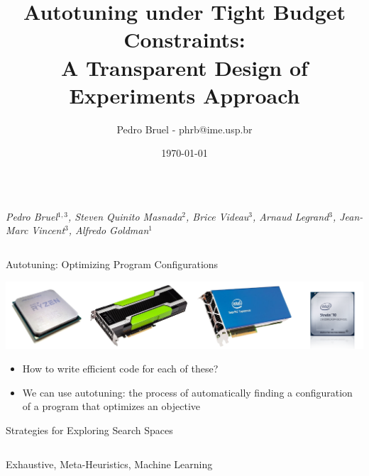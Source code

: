 \documentclass[11pt, compress, aspectratio=169, xcolor={table,usenames,dvipsnames}]{beamer}
\author{Pedro Bruel - phrb@ime.usp.br}
\date{\today}
\title{Autotuning under Tight Budget Constraints:  \\[0.3em] A Transparent Design of Experiments Approach}
\renewcommand\maketitle{}
\begin{document}
\maketitle

\begin{frame}
\begin{columns}
\begin{column}{0.89\columnwidth}
\vspace{-0.2em}
\begin{center}
  {\normalsize
    \textit{\alert{Pedro Bruel}$^{1,3}$, Steven Quinito Masnada$^{2}$, Brice
    Videau$^{3}$, Arnaud Legrand$^{3}$, Jean-Marc Vincent$^{3}$, Alfredo Goldman$^{1}$}
  }
\end{center}
\vspace{-0.8em}
\begin{columns}
\begin{column}[t]{0.48\columnwidth}
\begin{block}{Autotuning: Optimizing Program Configurations}
\begin{center}
\includegraphics[width=.9\columnwidth]{../../../img/architectures.png}
\end{center}

\begin{itemize}
\item How to write \alert{efficient code} for each of these?
\item We can use \alert{autotuning}: the process of \alert{automatically
finding} a \alert{configuration} of a program that optimizes an
\alert{objective}
\end{itemize}
\end{block}

\begin{block}{Strategies for Exploring Search Spaces}
\begin{columns}
\begin{column}{0.59\columnwidth}
\vspace{0.45em}
{\tiny

}
\begin{center}
{\tiny
\colorbox{red!25}{Exhaustive},
\colorbox{green!25}{Meta-Heuristics},
\colorbox{cyan!25}{Machine Learning}
}
\vspace{.5em}
\end{center}
\end{column}


\end{columns}
\end{block}
\end{column}
\end{columns}
\end{column}
\end{columns}
\end{frame}
\end{document}
